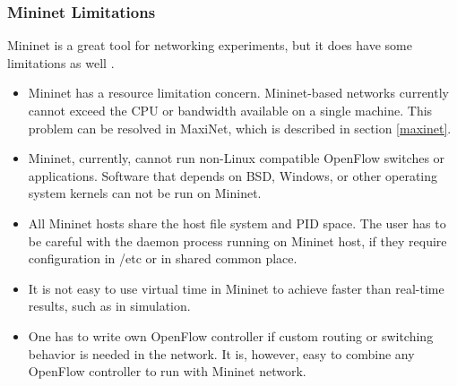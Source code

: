 \subsubsection{Mininet Limitations}
Mininet is a great tool for networking experiments, but it does have some limitations as well \cite{min-intro}.
\begin{itemize}
	\item Mininet has a resource limitation concern. Mininet-based networks currently cannot exceed the CPU or bandwidth available on a single machine. This problem can be resolved in MaxiNet, which is described in section \ref{maxinet}.
	\item Mininet, currently, cannot run non-Linux compatible OpenFlow switches or applications. Software that depends on BSD, Windows, or other operating system kernels can not be run on Mininet.
	\item All Mininet hosts share the host file system and PID space. The user has to be careful with the daemon process running on Mininet host, if they require configuration in /etc or in shared common place.
	\item It is not easy to use virtual time in Mininet to achieve faster than real-time results, such as in simulation.
	\item One has to write own OpenFlow controller if custom routing or switching behavior is needed in the network. It is, however, easy to combine any OpenFlow controller to run with Mininet network.
\end{itemize}

